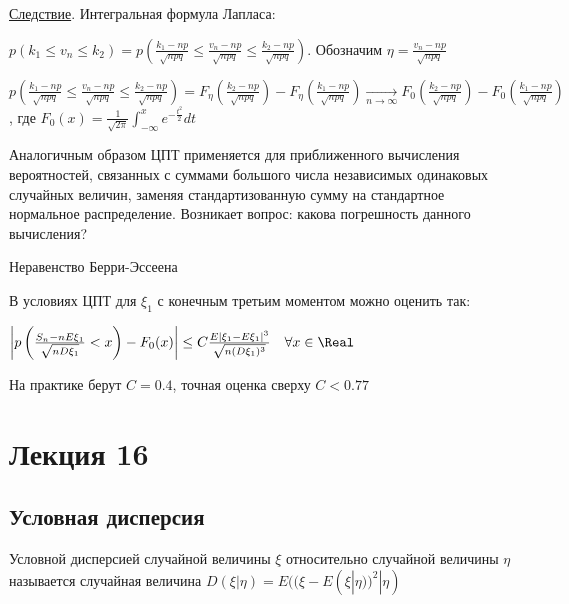 \documentclass[12pt]{article}
\begin{document}
\underline{Следствие}. Интегральная формула Лапласа:

$p(k_1 \leq v_n \leq k_2) = p\left(\frac{k_1 - np}{\sqrt{npq}} \leq \frac{v_n - np}{\sqrt{npq}} \leq \frac{k_2 - np}{\sqrt{npq}}\right)$. Обозначим $\eta = \frac{v_n - np}{\sqrt{npq}}$

$p\left(\frac{k_1 - np}{\sqrt{npq}} \leq \frac{v_n - np}{\sqrt{npq}} \leq \frac{k_2 - np}{\sqrt{npq}}\right) = F_\eta\left(\frac{k_2 - np}{\sqrt{npq}}\right) - F_\eta\left(\frac{k_1 - np}{\sqrt{npq}}\right) \underset{n \to \infty}{\longrightarrow} F_0\left(\frac{k_2 - np}{\sqrt{npq}}\right) - F_0\left(\frac{k_1 - np}{\sqrt{npq}}\right)$,
где $F_0(x) = \frac{1}{\sqrt{2\pi}} \int_{-\infty}^x e^{-\frac{t^2}{2}} dt$

\Nota Аналогичным образом ЦПТ применяется для приближенного вычисления вероятностей, связанных с суммами большого числа независимых одинаковых случайных величин, заменяя стандартизованную сумму на стандартное нормальное распределение.
Возникает вопрос: какова погрешность данного вычисления?

\hypertarget{berryesseentheorem}{}

\begin{MyTheorem}
    \Ths Неравенство Берри-Эссеена

    В условиях ЦПТ для $\xi_1$ с конечным третьим моментом можно оценить так:

    $\left|p\left(\frac{S_n - nE\xi_1}{\sqrt{nD\xi_1}} < x\right) - F_0(x)\right| \leq C\frac{E|\xi_1 - E\xi_1|^3}{\sqrt{n(D\xi_1)^3}} \quad \forall x \in \Real$
\end{MyTheorem}

\Nota На практике берут $C = 0.4$, точная оценка сверху $C < 0.77$






\section{Лекция 16}

\subsection{Условная дисперсия}

\hypertarget{conditionalvariance}{}

\Def Условной дисперсией случайной величины $\xi$ относительно случайной величины $\eta$ называется случайная величина 
$D(\xi | \eta) = E((\xi - E(\xi | \eta))^2 | \eta)$
\end{document}
